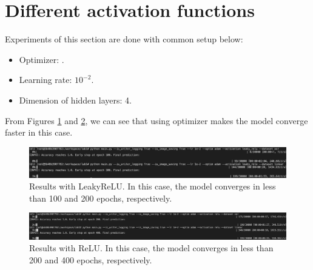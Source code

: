 \section{Different activation functions}
\indent
	Experiments of this section are done with common setup below: 
	\begin{itemize}
		\item Optimizer: .
		\item Learning rate: $10^{-2}$.
		\item Dimension of hidden layers: 4.
	\end{itemize}

	From Figures \ref{result-activation-leaky-relu} and \ref{result-activation-relu}, we can see that 
	using  optimizer makes the model converge faster in this case.
	
	\begin{figure}[H]
		\centering
		\includegraphics[scale=0.3]{img/adam_1e-2_leaky-relu.png}
		\caption{Results with LeakyReLU. In this case, the model converges in less than 100 and 200 epochs, respectively.}
		\label{result-activation-leaky-relu}
	\end{figure}
	\begin{figure}[H]
		\centering
		\includegraphics[scale=0.3]{img/adam_1e-2_relu.png}
		\caption{Results with ReLU. In this case, the model converges in less than 200 and 400 epochs, respectively.}
		\label{result-activation-relu}
	\end{figure}

